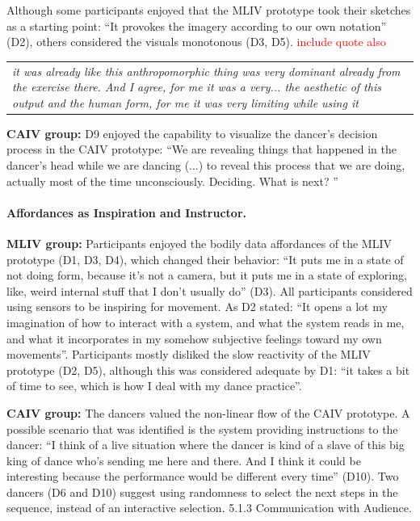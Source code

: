 Although some participants enjoyed that the MLIV prototype took their sketches as a starting point: “It provokes the imagery according to our own notation” (D2), others considered the visuals monotonous (D3, D5). \textcolor{red}{include quote also}

\begin{center}
\begin{tabular}{ p{13cm}}
\textit{it was already like this anthropomorphic thing was very dominant already from the exercise there. And I agree, for me it was a very... the aesthetic of this output and the human form, for me it was very limiting while using it}
\end{tabular}
\end{center}

\textbf{CAIV group:} D9 enjoyed the capability to visualize the dancer’s decision process in the CAIV prototype: “We are revealing things that happened in the dancer’s head while we are dancing (...) to reveal this process that we are doing, actually most of the time unconsciously. Deciding. What is next? ”

\paragraph{Affordances as Inspiration and Instructor.}

\textbf{MLIV group:} Participants enjoyed the bodily data affordances of the MLIV prototype (D1, D3, D4), which changed their behavior: “It puts me in a state of not doing form, because it’s not a camera, but it puts me in a state of exploring, like, weird internal stuff that I don’t usually do” (D3). All participants considered using sensors to be inspiring for movement. As D2 stated: “It opens a lot my imagination of how to interact with a system, and what the system reads in me, and what it incorporates in my somehow subjective feelings toward my own movements”. Participants mostly disliked the slow reactivity of the MLIV prototype (D2, D5), although this was considered adequate by D1: “it takes a bit of time to see, which is how I deal with my dance practice”.

\textbf{CAIV group:} The dancers valued the non-linear flow of the CAIV prototype. A possible scenario that was identified is the system providing instructions to the dancer: “I think of a live situation where the dancer is kind of a slave of this big king of dance who’s sending me here and there. And I think it could be interesting because the performance would be different every time” (D10). Two dancers (D6 and D10) suggest using randomness to select the next steps in the sequence, instead of an interactive selection.
5.1.3 Communication with Audience. 

